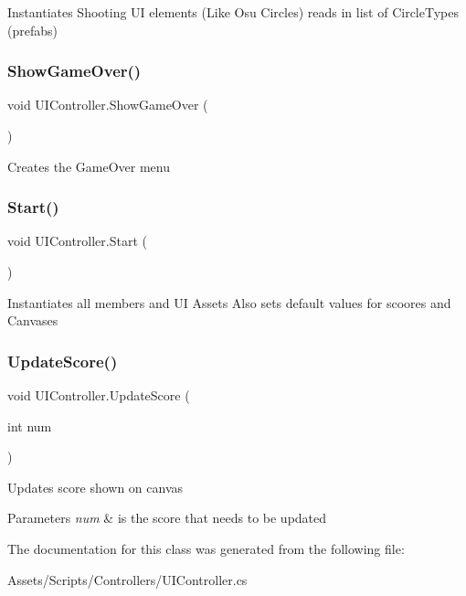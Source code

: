 Instantiates Shooting UI elements (Like Osu Circles) reads in list of Circle\+Types (prefabs) \mbox{\label{class_u_i_controller_a0c9a9ed0d8276bed8374ee2ee484ff0f}} 
\subsubsection{\texorpdfstring{Show\+Game\+Over()}{ShowGameOver()}}
{\footnotesize\ttfamily void U\+I\+Controller.\+Show\+Game\+Over (\begin{DoxyParamCaption}{ }\end{DoxyParamCaption})}

Creates the Game\+Over menu \mbox{\label{class_u_i_controller_a676b3b972c33885db4565ee43f23e459}} 
\subsubsection{\texorpdfstring{Start()}{Start()}}
{\footnotesize\ttfamily void U\+I\+Controller.\+Start (\begin{DoxyParamCaption}{ }\end{DoxyParamCaption})\hspace{0.3cm}{\ttfamily [private]}}

Instantiates all members and UI Assets Also sets default values for scoores and Canvases \mbox{\label{class_u_i_controller_a87a0993fd494e90a55c6414d75467dd7}} 
\subsubsection{\texorpdfstring{Update\+Score()}{UpdateScore()}}
{\footnotesize\ttfamily void U\+I\+Controller.\+Update\+Score (\begin{DoxyParamCaption}\item[{int}]{num }\end{DoxyParamCaption})}

Updates score shown on canvas 
\begin{DoxyParams}{Parameters}
{\em num} & is the score that needs to be updated \\
\hline
\end{DoxyParams}


The documentation for this class was generated from the following file\+:\begin{DoxyCompactItemize}
\item 
Assets/\+Scripts/\+Controllers/U\+I\+Controller.\+cs\end{DoxyCompactItemize}
